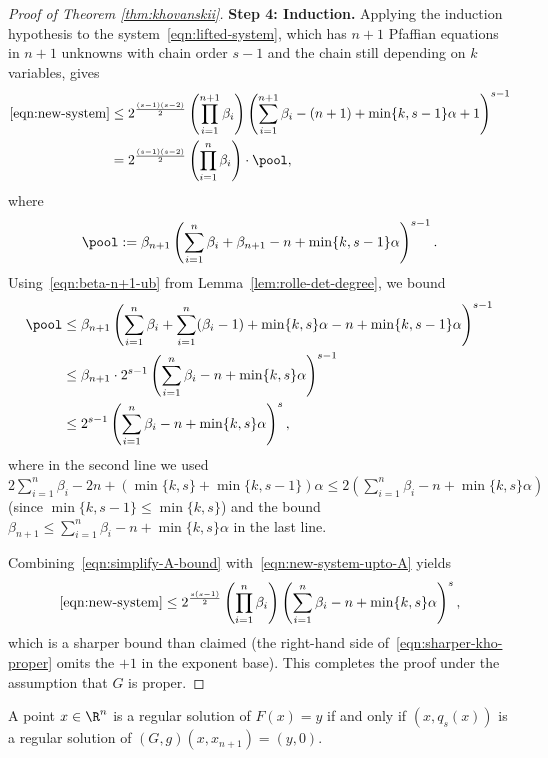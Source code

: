 \begin{proof}[Proof of Theorem \ref{thm:khovanskii}]
\medskip
\noindent\textbf{Step 4: Induction.}
Applying the induction hypothesis to the system~\eqref{eqn:lifted-system}, which has $n+1$ Pfaffian equations in $n+1$ unknowns with chain order $s-1$ and the chain still depending on $k$ variables, gives
\begin{align}
  \eqref{eqn:new-system} &\le 2^{\frac{(s-1)(s-2)}{2}} \left(\prod_{i=1}^{n+1} \beta_i\right) \left(\sum_{i=1}^{n+1}\beta_i - (n+1) + \min\{k,s-1\}\alpha + 1\right)^{s-1} \nonumber \\
  &= 2^{\frac{(s-1)(s-2)}{2}} \left(\prod_{i=1}^{n} \beta_i\right) \cdot \pool, \label{eqn:new-system-upto-A}
\end{align}
where
\begin{equation*}
  \pool := \beta_{n+1} \left(\sum_{i=1}^{n}\beta_i + \beta_{n+1} - n + \min\{k,s-1\}\alpha\right)^{s-1}.
\end{equation*}
Using~\eqref{eqn:beta-n+1-ub} from Lemma~\ref{lem:rolle-det-degree}, we bound
\begin{align}
  \pool &\le \beta_{n+1} \left(\sum_{i=1}^{n}\beta_i + \sum_{i=1}^n (\beta_i - 1) + \min\{k, s\}\alpha - n + \min\{k,s-1\}\alpha\right)^{s-1} \nonumber \\
  &\le \beta_{n+1} \cdot 2^{s-1}\left(\sum_{i=1}^{n}\beta_i - n + \min\{k,s\}\alpha\right)^{s-1} \nonumber \\
  &\le 2^{s-1}\left(\sum_{i=1}^{n}\beta_i - n + \min\{k,s\}\alpha\right)^{s}, \label{eqn:simplify-A-bound}
\end{align}
where in the second line we used $2\sum_{i=1}^n\beta_i - 2n + (\min\{k,s\}+\min\{k,s-1\})\alpha \le 2(\sum_{i=1}^n\beta_i - n + \min\{k,s\}\alpha)$ (since $\min\{k,s-1\}\le \min\{k,s\}$) and the bound $\beta_{n+1} \le \sum_{i=1}^n\beta_i - n + \min\{k,s\}\alpha$ in the last line.

Combining~\eqref{eqn:simplify-A-bound} with~\eqref{eqn:new-system-upto-A} yields
\begin{equation} \label{eqn:sharper-kho-proper}
  \eqref{eqn:new-system} \le 2^{\frac{s(s-1)}{2}}\left(\prod_{i=1}^n \beta_i \right)\left(\sum_{i=1}^{n}\beta_i - n + \min\{k,s\}\alpha\right)^s,
\end{equation}
which is a sharper bound than claimed (the right-hand side of~\eqref{eqn:sharper-kho-proper} omits the $+1$ in the exponent base). This completes the proof under the assumption that $G$ is proper.
\end{proof}

\begin{claim} \label{claim:regular-solutions}
  A point $x \in \R^n$ is a regular solution of $F(x) = y$ if and only if $(x, q_s(x))$ is a regular solution of $(G, g)(x, x_{n+1}) = (y, 0)$.
  \end{claim}
  
